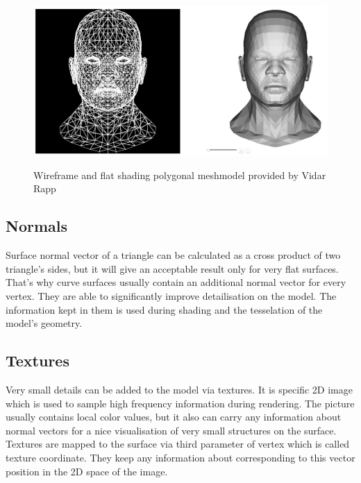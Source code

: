 \documentclass[twoside, english, 11pt]{report}
\begin{document}
\begin{figure}[!h]
\includegraphics[scale=0.55]{img/mesh}\\
\caption{Wireframe and flat shading polygonal meshmodel provided by Vidar Rapp\label{fig:mesh}}
\end{figure}

\subsection{Normals}
Surface normal vector of a triangle can be calculated as a cross product of two triangle's sides, but it will give an acceptable result only for very flat surfaces. That's why curve surfaces usually contain an additional normal vector for every vertex. They are able to significantly improve detailisation on the model. The information kept in them is used during shading and the tesselation of the model's geometry.\\


\subsection{Textures}
Very small details can be added to the model via textures. It is specific 2D image which is used to sample high frequency information during rendering. The picture usually contains local color values, but it also can carry any information about normal vectors for a nice visualisation of very small structures on the surface. Textures are mapped to the surface via third parameter of vertex which is called texture coordinate. They keep any information about corresponding to this vector position in the 2D space of the image.\\

\end{document}
